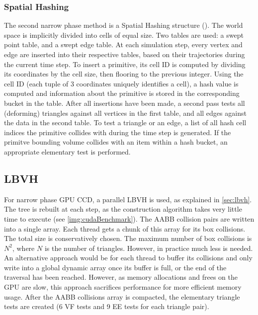 \subsubsection{Spatial Hashing}
\label{sub-sec:hash}

The second narrow phase method is a Spatial Hashing structure (\citep{thm03}). The world space is implicitly divided into cells of equal size. Two tables are used: a swept point table, and a swept edge table. At each simulation step, every vertex and edge are inserted into their respective tables, based on their trajectories during the current time step. To insert a primitive, its cell ID is computed by dividing its coordinates by the cell size, then flooring to the previous integer. Using the cell ID (each tuple of 3 coordinates uniquely identifies a cell), a hash value is computed and information about the primitive is stored in the corresponding bucket in the table. After all insertions have been made, a second pass tests all (deforming) triangles against all vertices in the first table, and all edges against the data in the second table. To test a triangle or an edge, a list of all hash cell indices the primitive collides with during the time step is generated. If the primitve bounding volume collides with an item within a hash bucket, an appropriate elementary test is performed.

\subsection{LBVH}
\label{sub-sec:lbvhimpl}

For narrow phase GPU CCD, a parallel LBVH is used, as explained in \autoref{sec:lbvh}. The tree is rebuilt at each step, as the construction algorithm takes very little time to execute (see \autoref{img:cudaBenchmark}). The AABB collision pairs are written into a single array. Each thread gets a chunk of this array for its box collisions. The total size is conservatively chosen. The maximum number of box collisions is $N^2$, where $N$ is the number of triangles. However, in practice much less is needed. An alternative approach would be for each thread to buffer its collisions and only write into a global dynamic array once its buffer is full, or the end of the traversal has been reached. However, as memory allocations and frees on the GPU are slow, this approach sacrifices performance for more efficient memory usage. After the AABB collisions array is compacted, the elementary triangle tests are created (6 VF tests and 9 EE tests for each triangle pair).


